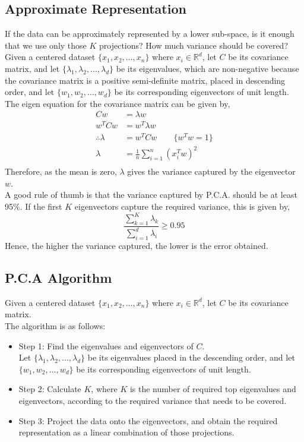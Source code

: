 \documentclass[letterpaper,11pt]{article}
\begin{document}
\subsection{Approximate Representation}
If the data can be approximately represented by a lower sub-space, is it enough that we use only those $K$ projections? How much variance should be covered?
\newpage
Given a centered dataset $\{x_1, x_2, \ldots, x_n\}$ where $x_i \in \mathbb{R}^{d}$, let $C$ be its covariance matrix, and let $\{\lambda_1, \lambda_2, \ldots, \lambda_d \}$ be its eigenvalues, which are non-negative because the covariance matrix is a positive semi-definite matrix, placed in descending order, and let $\{w_1, w_2, \ldots, w_d \}$ be its corresponding eigenvectors of unit length. \\
The eigen equation for the covariance matrix can be given by,
\begin{align*}
    Cw &= \lambda w \\
    w^TCw &= w^T\lambda w\\
    \therefore \lambda &= w^TCw \hspace{2em} \{w^Tw = 1\} \\
    \lambda &= \frac{1}{n} \sum _{i=1} ^{n} (x_i^Tw)^2 \\
\end{align*}
Therefore, as the mean is zero, $\lambda$ gives the variance captured by the eigenvector $w$. \\
A good rule of thumb is that the variance captured by P.C.A. should be at least 95\%. 
If the first $K$ eigenvectors capture the required variance, this is given by,
$$
\frac{\displaystyle \sum _{k=1} ^{K} \lambda_k}{\displaystyle \sum _{i=1} ^{d} \lambda_i} \ge 0.95
$$ 
Hence, the higher the variance captured, the lower is the error obtained.

\subsection{P.C.A Algorithm}
Given a centered dataset $\{x_1, x_2, \ldots, x_n\}$ where $x_i \in \mathbb{R}^{d}$, let $C$ be its covariance matrix.\\
The algorithm is as follows:
\begin{itemize}
    \item Step 1: Find the eigenvalues and eigenvectors of $C$. \\
    Let $\{\lambda_1, \lambda_2, \ldots, \lambda_d \}$ be its eigenvalues placed in the descending order, and let $\{w_1, w_2, \ldots, w_d \}$ be its corresponding eigenvectors of unit length.
    \item Step 2: Calculate $K$, where $K$ is the number of required top eigenvalues and eigenvectors, according to the required variance that needs to be covered.
    \item Step 3: Project the data onto the eigenvectors, and obtain the required representation as a linear combination of those projections. 
\end{itemize}
\end{document}
